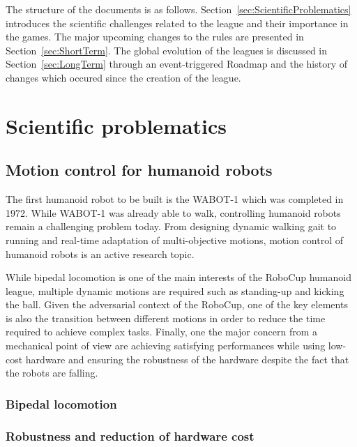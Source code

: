 \documentclass{article}
\begin{document}
The structure of the documents is as
follows. Section~\ref{sec:ScientificProblematics} introduces the scientific
challenges related to the league and their importance in the games. The major
upcoming changes to the rules are presented in Section~\ref{sec:ShortTerm}. The
global evolution of the leagues is discussed in Section~\ref{sec:LongTerm}
through an event-triggered Roadmap and the history of changes which occured
since the creation of the league.

\section{\label{sec:ScientificProblematics}Scientific problematics}

\subsection{Motion control for humanoid robots}

The first humanoid robot to be built is the WABOT-1 which was completed in
1972. While WABOT-1 was already able to walk, controlling humanoid robots remain
a challenging problem today. From designing dynamic walking gait to running and
real-time adaptation of multi-objective motions, motion control of humanoid
robots is an active research topic.

While bipedal locomotion is one of the main interests of the RoboCup humanoid
league, multiple dynamic motions are required such as standing-up and kicking
the ball. Given the adversarial context of the RoboCup, one of the key elements
is also the transition between different motions in order to reduce the time
required to achieve complex tasks. Finally, one the major concern from a
mechanical point of view are achieving satisfying performances while using
low-cost hardware and ensuring the robustness of the hardware despite the fact
that the robots are falling.

\subsubsection{Bipedal locomotion}



\subsubsection{Robustness and reduction of hardware cost}
\end{document}
